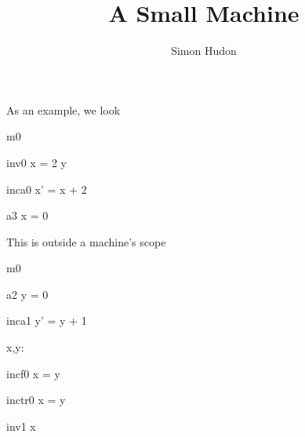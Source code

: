 \documentclass[12pt]{amsart}
\title{A Small Machine}
\author{Simon Hudon}
\date{} %
\begin{document}
\maketitle

As an example, we look

\begin{machine}{m0}


\begin{invariant}{inv0}
	x = 2 \cdot y
\end{invariant}

\begin{evassignment}{inc}{a0}
	x' = x + 2
\end{evassignment}

\begin{initialization}{a3}
	x = 0
\end{initialization}


\end{machine}
This is outside a machine's scope

\begin{machine}{m0}

\begin{initialization}{a2}
	y = 0
\end{initialization}

\begin{evassignment}{inc}{a1}
	y' = y + 1
\end{evassignment}

\begin{variable}
	x,y: \Int
\end{variable}

\begin{fschedule}{inc}{f0}
	x = y
\end{fschedule}

\begin{transient}{inc}{tr0}
	x = y
\end{transient}

\begin{invariant}{inv1}
	x 
\end{invariant}

\end{machine}
\end{document}
